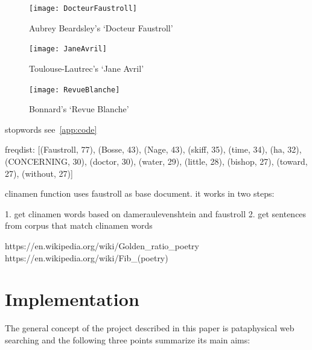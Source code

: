 \begin{figure}[htbp]
  \centering
  \texttt{[image: DocteurFaustroll]}
  \caption[Aubrey Beardsley's `Docteur Faustroll']{Aubrey Beardsley's `Docteur Faustroll'}
\label{fig:beardsley}
\end{figure}

\begin{figure}[htbp]
  \centering
  \texttt{[image: JaneAvril]}
  \caption[Toulouse-Lautrec's `Jane Avril']{Toulouse-Lautrec's `Jane Avril'}
\label{fig:toulouse}
\end{figure}

\begin{figure}[htbp]
  \centering
  \texttt{[image: RevueBlanche]}
  \caption[Bonnard's `Revue Blanche']{Bonnard's `Revue Blanche'}
\label{fig:bonnard}
\end{figure}




stopwords see~\ref{app:code}

freqdist:
[(Faustroll, 77), (Bosse, 43), (Nage, 43), (skiff, 35), (time, 34), (ha, 32),  (CONCERNING, 30), (doctor, 30), (water, 29), (little, 28), (bishop, 27), (toward, 27), (without, 27)]



clinamen function uses faustroll as base document. it works in two steps:

1. get clinamen words based on dameraulevenshtein and faustroll
2. get sentences from corpus that match clinamen words


https://en.wikipedia.org/wiki/Golden_ratio_poetry
https://en.wikipedia.org/wiki/Fib_(poetry)










\section{Implementation}

The general concept of the project described in this paper is pataphysical web searching and the following three points summarize its main aims:

